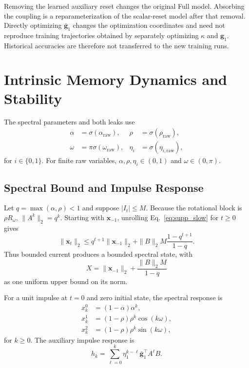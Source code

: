 \documentclass[letterpaper]{article}
\begin{document}
Removing the learned auxiliary reset changes the original Full model. Absorbing the coupling is a reparameterization of the scalar-reset model after that removal. Directly optimizing $\bar{\mathbf g}_1$ changes the optimization coordinates and need not reproduce training trajectories obtained by separately optimizing $\kappa$ and $\mathbf g_1$. Historical accuracies are therefore not transferred to the new training runs.

\section{Intrinsic Memory Dynamics and Stability}

The spectral parameters and both leaks use
\begin{equation}
\begin{aligned}
\alpha&=\sigma(\alpha_{\mathrm{raw}}),& \rho&=\sigma(\rho_{\mathrm{raw}}),\\
\omega&=\pi\sigma(\omega_{\mathrm{raw}}),& \eta_i&=\sigma(\eta_{i,\mathrm{raw}}),
\end{aligned}
\label{eq:supp_param}
\end{equation}
for $i\in\{0,1\}$. For finite raw variables, $\alpha,\rho,\eta_i\in(0,1)$ and $\omega\in(0,\pi)$.

\subsection{Spectral Bound and Impulse Response}

Let $q=\max(\alpha,\rho)<1$ and suppose $|I_t|\le M$. Because the rotational block is $\rho R_\omega$, $\|A^k\|_2=q^k$. Starting with $\mathbf x_{-1}$, unrolling Eq.~\eqref{eq:supp_slow} for $t\ge0$ gives
\begin{equation}
\|\mathbf x_t\|_2\le q^{t+1}\|\mathbf x_{-1}\|_2+\|B\|_2 M\frac{1-q^{t+1}}{1-q}.
\label{eq:supp_bibo_bound}
\end{equation}
Thus bounded current produces a bounded spectral state, with
\begin{equation}
X=\|\mathbf x_{-1}\|_2+\frac{\|B\|_2M}{1-q}
\end{equation}
as one uniform upper bound on its norm.

For a unit impulse at $t=0$ and zero initial state, the spectral response is
\begin{align}
x_k^0&=(1-\alpha)\alpha^k,\\
x_k^1&=(1-\rho)\rho^k\cos(k\omega),\\
x_k^2&=(1-\rho)\rho^k\sin(k\omega),
\label{eq:supp_impulse}
\end{align}
for $k\ge0$. The auxiliary impulse response is
\begin{equation}
h_k=\sum_{\ell=0}^k\eta_1^{k-\ell}\bar{\mathbf g}_1^\top A^\ell B.
\label{eq:supp_auxiliary_impulse}
\end{equation}
\end{document}
